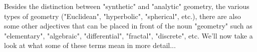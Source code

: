 \medskip
Besides the distinction between "synthetic" and "analytic" geometry, the various types of geometry ("Euclidean", "hyperbolic", "spherical", etc.), there are also some other adjectives that can be placed in front of the noun "geometry" such as "elementary", "algebraic", "differential", "fractal", "discrete", etc. We'll now take a look at what some of these terms mean in more detail...

\begin{comment}

https://en.wikipedia.org/wiki/Synthetic_geometry
https://en.wikipedia.org/wiki/Straightedge_and_compass_construction

https://en.wikipedia.org/wiki/Rigid_transformation

https://en.wikipedia.org/wiki/Similarity_(geometry)
https://en.wikipedia.org/wiki/Congruence_(geometry)
https://en.wikipedia.org/wiki/Erlangen_program

https://en.wikipedia.org/wiki/Playfair%

What defines "a" geometry? A set of axioms? Or a set/group of transformations? Or a metric? What is a model of a geometry?
I think, "a geometry" is indeed define by a set of axioms and a model for such a geometry is defined by a set of transformations and a metric? To state the axioms, we need a couple of basic concepts, such as "points", "lines", "angles", etc.

-axiomatic approach by Euclid, later by Hilbert
-classification of geometries (Felix Klein's Erlangen program)

https://en.wikipedia.org/wiki/Geometrization_conjecture#The_eight_Thurston_geometries

https://en.wikipedia.org/wiki/Erlangen_program

https://en.wikipedia.org/wiki/Poincar%

https://en.wikipedia.org/wiki/Hyperbolic_geometry#Models_of_the_hyperbolic_plane

https://en.wikipedia.org/wiki/Euclidean_geometry
https://en.wikipedia.org/wiki/Spherical_geometry
https://en.wikipedia.org/wiki/Elliptic_geometry
https://en.wikipedia.org/wiki/Hyperbolic_geometry

https://en.wikipedia.org/wiki/Hilbert%
https://en.wikipedia.org/wiki/Foundations_of_geometry

-synthetic vs. analytic geometry

https://www.youtube.com/watch?v=EmLzMYr6uHU

\end{comment}